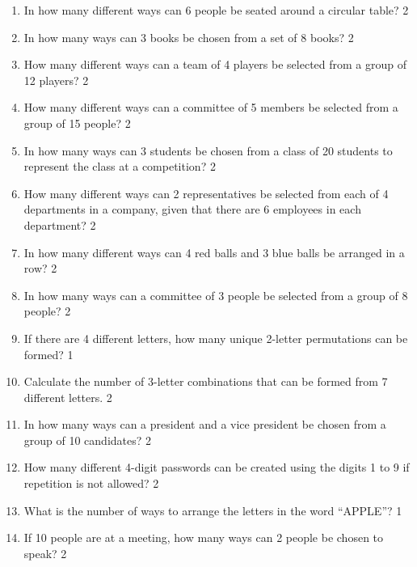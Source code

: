 \documentclass[a4paper,oneside, margin=1.4in]{book}
\begin{document}
\begin{enumerate}
\item
In how many different ways can 6 people be seated around a circular table? \hfill 2

\item
In how many ways can 3 books be chosen from a set of 8 books? \hfill 2

\item
How many different ways can a team of 4 players be selected from a group of 12 players? \hfill 2

\item
How many different ways can a committee of 5 members be selected from a group of 15 people? \hfill 2

\item
In how many ways can 3 students be chosen from a class of 20 students to represent the class at a competition? \hfill 2

\item
How many different ways can 2 representatives be selected from each of 4 departments in a company, given that there are 6 employees in each department? \hfill 2


\item
In how many different ways can 4 red balls and 3 blue balls be arranged in a row? \hfill 2


\item In how many ways can a committee of 3 people be selected from a group of 8 people? \hfill 2

\item If there are 4 different letters, how many unique 2-letter permutations can be formed? \hfill 1

\item Calculate the number of 3-letter combinations that can be formed from 7 different letters. \hfill 2

\item In how many ways can a president and a vice president be chosen from a group of 10 candidates? \hfill 2

\item How many different 4-digit passwords can be created using the digits 1 to 9 if repetition is not allowed? \hfill 2

\item What is the number of ways to arrange the letters in the word “APPLE”? \hfill 1

\item If 10 people are at a meeting, how many ways can 2 people be chosen to speak? \hfill 2


\end{enumerate}
\end{document}
